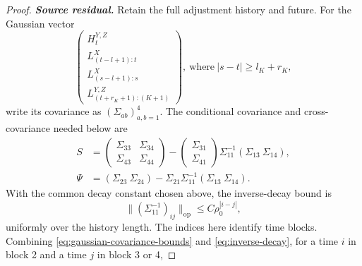 \documentclass[12pt]{article}
\numberwithin{equation}{section}
\begin{document}
\begin{proof}
\smallskip\noindent\textit{\textbf{Source residual.}}
Retain the full adjustment history and future. For the Gaussian vector
\begin{equation}\label{eq:source-blocks}
 \begin{pmatrix}
 H_t^{Y,Z}\\L^X_{(t-l+1):t}\\L^X_{(s-l+1):s}\\
 L^{Y,Z}_{(t+r_K+1):(K+1)}
 \end{pmatrix},~ \text{where}~|s-t|\geq l_K+r_K,
\end{equation}
write its covariance as $(\Sigma_{ab})_{a,b=1}^4$. The conditional
covariance and cross-covariance needed below are
\begin{align*}
 S&=\begin{pmatrix}\Sigma_{33}&\Sigma_{34}\\
                         \Sigma_{43}&\Sigma_{44}\end{pmatrix}
       -\begin{pmatrix}\Sigma_{31}\\\Sigma_{41}\end{pmatrix}
          \Sigma_{11}^{-1}(\Sigma_{13}\ \Sigma_{14}),\\
 \Psi&=(\Sigma_{23}\ \Sigma_{24})
          -\Sigma_{21}\Sigma_{11}^{-1}(\Sigma_{13}\ \Sigma_{14}).
\end{align*}
With the common decay constant chosen above, the inverse-decay bound is
\begin{equation}\label{eq:inverse-decay}
 \|(\Sigma_{11}^{-1})_{ij}\|_{\mathrm{op}}
 \leq C\rho_0^{|i-j|},
\end{equation}
uniformly over the history length.
The indices here identify time blocks. Combining
\eqref{eq:gaussian-covariance-bounds} and \eqref{eq:inverse-decay},
for a time $i$ in block 2 and a time $j$ in block 3 or 4,

\end{proof}
\end{document}
